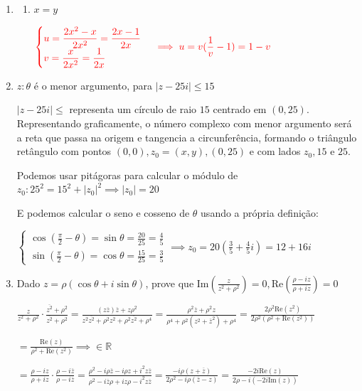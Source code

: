 \documentclass[12pt, openright, a4paper, twoside, english, brazil]{article}
\newenvironment{qitem}{
  \color{black}
\item}{\vspace{10pt}}
\newenvironment{qmitem}{
  \color{black}
\item
\begin{enumerate}[\bfseries a)]}{
\end{enumerate}\vspace{10pt}}
\newcommand{\cis}[1]{\displaystyle(\cos#1+i\sin#1)}
\begin{document}
\begin{enumerate}[\bfseries 1.]
\begin{qmitem}
  \item $x=y$

    $\color{red}
    \begin{cases}
      \displaystyle u=\frac{2x^2-x}{2x^2}=\frac{2x-1}{2x}\\
      \displaystyle v=\frac{x}{2x^2}=\frac{1}{2x}
    \end{cases}\implies u=v(\displaystyle\frac1v-1)=1-v$
  \end{qmitem}

  \begin{qitem} %
    $z:\theta$ é o menor argumento, para $|z-25i|\le15$

    \color{red}
    $|z-25i|\le$ representa um círculo de raio $15$ centrado em
    $(0,25)$. Representando graficamente, o número complexo com menor
    argumento será a reta que passa na origem e tangencia a
    circunferência, formando o triângulo retângulo com pontos
    $(0,0),z_0=(x,y),(0,25)$ e com lados $z_0,15$ e $25$.

    Podemos usar pitágoras para calcular o módulo de $z_0:
    25^2=15^2+|z_0|^2\implies |z_0|=20$

    E podemos calcular o seno e cosseno de $\theta$ usando a própria definição:

    $
    \begin{cases}\displaystyle\cos\left(\frac{\pi}{2}-\theta\right)=\sin\theta=\frac{20}{25}=\frac45\\\displaystyle\sin\left(\frac{\pi}{2}-\theta\right)=\cos\theta=\frac{15}{25}=\frac35
    \end{cases}\implies \displaystyle
    z_0=20\left(\frac35+\frac45i\right)=12+16i$
  \end{qitem}

  \begin{qitem} %
    Dado $z=\rho\cis\theta$, prove que
    $\displaystyle\text{Im}\left(\frac{z}{z^2+\rho^2}\right)=0,\text{Re}\left(\frac{\rho-iz}{\rho+iz}\right)=0$

    \color{red}
    $\displaystyle\frac{z}{z^2+\rho^2}\cdot\frac{\overline{z^2}+\rho^2}{\overline{z^2}+\rho^2}=\frac{(z\overline
      z)\overline
    z+z\rho^2}{z^2\overline{z^2}+\rho^2z^2+\rho^2\overline{z^2}+\rho^4}=\frac{\rho^2\overline{z}+\rho^2z}{\rho^4+\rho^2(z^2+\overline{z}^2)+\rho^4}=\frac{2\rho^2\text{Re}(z^2)}{2\rho^2(\rho^2+\text{Re}(z^2))}$

    $\displaystyle=\frac{\text{Re}(z)}{\rho^2+\text{Re}(z^2)}\implies
    \in\mathbb R$

    $\displaystyle=\frac{\rho-iz}{\rho+iz}\cdot\frac{\rho-i\overline{z}}{\rho-i\overline{z}}=\frac{\rho^2-i\rho\overline{z}-i\rho
    z+i^2z\overline{z}}{\rho^2-i\overline{z}\rho+iz\rho-i^2z\overline{z}}=\frac{-i\rho(z+\overline
    z)}{2\rho^2-i\rho(\overline
    z-z)}=\frac{-2i\text{Re}(z)}{2\rho-i(-2i\text{Im}(z))}$


\end{qitem}
\end{enumerate}
\end{document}
